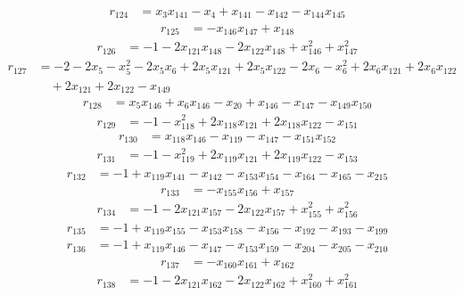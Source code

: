 \begin{align*}
r_{124}&=
x_{3}x_{141}-x_{4}+x_{141}-x_{142}-x_{144}x_{145}
\end{align*}
\begin{align*}
r_{125}&=
-x_{146}x_{147}+x_{148}
\end{align*}
\begin{align*}
r_{126}&=
-1-2x_{121}x_{148}-2x_{122}x_{148}+x_{146}^{2}+x_{147}^{2}
\end{align*}
\begin{align*}
r_{127}&=
-2-2x_{5}-x_{5}^{2}-2x_{5}x_{6}+2x_{5}x_{121}+2x_{5}x_{122}-2x_{6}-x_{6}^{2}+2x_{6}x_{121}+2x_{6}x_{122} \\
&\quad +2x_{121}+2x_{122}-x_{149}
\end{align*}
\begin{align*}
r_{128}&=
x_{5}x_{146}+x_{6}x_{146}-x_{20}+x_{146}-x_{147}-x_{149}x_{150}
\end{align*}
\begin{align*}
r_{129}&=
-1-x_{118}^{2}+2x_{118}x_{121}+2x_{118}x_{122}-x_{151}
\end{align*}
\begin{align*}
r_{130}&=
x_{118}x_{146}-x_{119}-x_{147}-x_{151}x_{152}
\end{align*}
\begin{align*}
r_{131}&=
-1-x_{119}^{2}+2x_{119}x_{121}+2x_{119}x_{122}-x_{153}
\end{align*}
\begin{align*}
r_{132}&=
-1+x_{119}x_{141}-x_{142}-x_{153}x_{154}-x_{164}-x_{165}-x_{215}
\end{align*}
\begin{align*}
r_{133}&=
-x_{155}x_{156}+x_{157}
\end{align*}
\begin{align*}
r_{134}&=
-1-2x_{121}x_{157}-2x_{122}x_{157}+x_{155}^{2}+x_{156}^{2}
\end{align*}
\begin{align*}
r_{135}&=
-1+x_{119}x_{155}-x_{153}x_{158}-x_{156}-x_{192}-x_{193}-x_{199}
\end{align*}
\begin{align*}
r_{136}&=
-1+x_{119}x_{146}-x_{147}-x_{153}x_{159}-x_{204}-x_{205}-x_{210}
\end{align*}
\begin{align*}
r_{137}&=
-x_{160}x_{161}+x_{162}
\end{align*}
\begin{align*}
r_{138}&=
-1-2x_{121}x_{162}-2x_{122}x_{162}+x_{160}^{2}+x_{161}^{2}
\end{align*}
